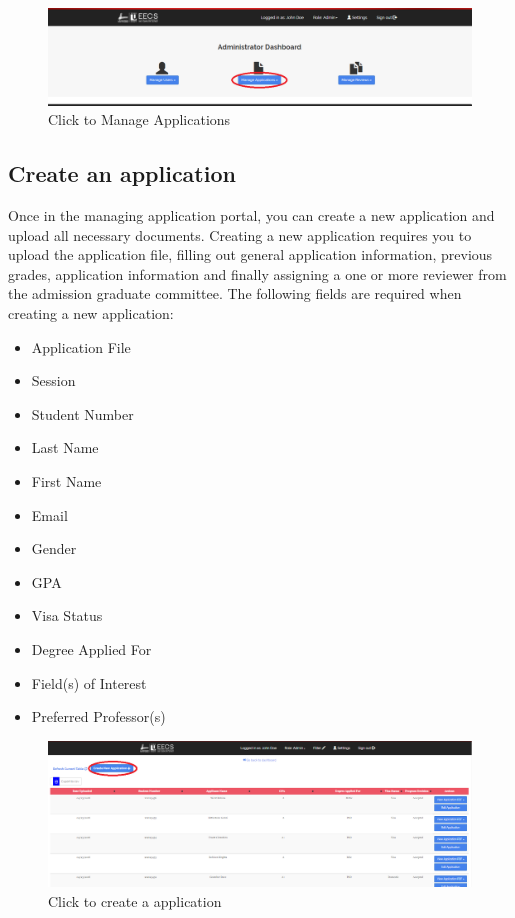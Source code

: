 \documentclass[fontsize=12pt,paper=letter,twoside]{scrartcl}
\begin{document}
\begin{figure}[!htb]
\begin{center}
\includegraphics[width=.99\textwidth]{images/ma/manage_app.png}
\end{center}
\caption{Click to Manage Applications}
\label{fig:manage_app}
\end{figure}

\subsection{Create an application} \label{c_appl}
Once in the managing application portal, you can create a new application and upload all necessary documents. Creating a new application requires you to upload the application file, filling out general application information, previous grades, application information and finally assigning a one or more reviewer from the admission graduate committee. The following fields are required when creating a new application:
\begin{itemize}
\item Application File
\item Session
\item Student Number
\item Last Name
\item First Name
\item Email
\item Gender
\item GPA
\item Visa Status
\item Degree Applied For
\item Field(s) of Interest
\item Preferred Professor(s)
\end{itemize}

\begin{figure}[!htb]
\begin{center}
\includegraphics[width=.99\textwidth]{images/ma/new_app_click.png}
\end{center}
\caption{Click to create a application}
\label{fig:new_app_click}
\end{figure}
\end{document}
